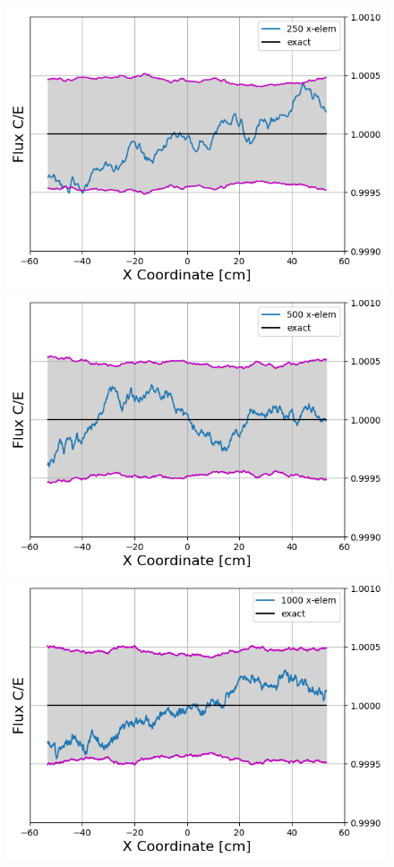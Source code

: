 \documentclass[letterpaper]{mc2023}
\begin{document}
\begin{figure}[H]
\begin{minipage}[b]{0.495\linewidth}
        \includegraphics[width=\linewidth]{figures/250_flux_CE_error_bars}
    \end{minipage}
    \begin{minipage}[b]{0.495\linewidth}
        \includegraphics[width=\linewidth]{figures/500_flux_CE_error_bars}
    \end{minipage}
    \begin{minipage}[b]{0.495\linewidth}
        \includegraphics[width=\linewidth]{figures/1000_flux_CE_error_bars}

\end{minipage}
\end{figure}
\end{document}
